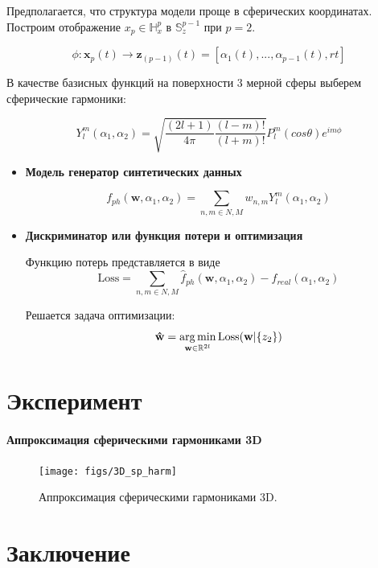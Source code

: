 \documentclass[12pt,twoside]{article}
\begin{document}
Предполагается, что структура модели проще в сферических координатах.
Построим отображение $x_p \in \mathbb{H}_{x}^{p} $ в $\mathbb{S}_{z}^{p-1} $ при $p = 2$.

\begin{equation}
	\phi: \mathbf{x}_p(t)  \xrightarrow{} \mathbf{z}_{(p-1)}(t) = [\alpha_{1} (t),..., \alpha_{p-1}(t), r{t}]
\label{eq:param_model2}
\end{equation}

В качестве базисных функций на поверхности 3 мерной сферы выберем сферические гармоники:

\begin{equation}
	Y_l^m(\alpha_1,\alpha_2) = \sqrt{ \frac{(2l+1)}{4\pi} \frac{(l-m)!}{(l+m)!} } P_l^m(cos\theta)e^{im\phi}
\label{eq:Yml}
\end{equation}

\begin{itemize}
\item \textbf{Модель генератор синтетических данных}

\begin{equation}
	f_{ph}(\mathbf{w},\alpha_1,\alpha_2) = \sum_{n,m \in N,M} w_{n,m}Y_l^m(\alpha_1,\alpha_2)
\label{eq:f_ph_3d}
\end{equation}
\vspace{\baselineskip}

\item \textbf{Дискриминатор или функция потери и оптимизация}

Функцию потерь представляется в виде
\begin{equation}
\textrm{Loss} =  \sum_{n,m \in N,M} \hat{f}_{ph}(\mathbf{w},\alpha_1,\alpha_2) - f_{real}(\alpha_{1},\alpha_2)
\label{eq:L_3d}
\end{equation}

Решается задача оптимизации:
\begin{equation}
\mathbf{\hat{w}} = \argmin_{\mathbf{w} \in \mathbb{R}^{2l}} \textrm{Loss}(\mathbf{w}|\{z_{2}\})
\label{eq:arg_l}
\end{equation}
\end{itemize}


\section{Эксперимент}

\paragraph{Аппроксимация сферическими гармониками 3D}

\begin{figure}[h]
\centering
\texttt{[image: figs/3D\_sp\_harm]}
\caption{Аппроксимация сферическими гармониками 3D. }
\label{fg:3D_sp_harm}
\end{figure}

\section{Заключение}
\newpage


\end{document}
